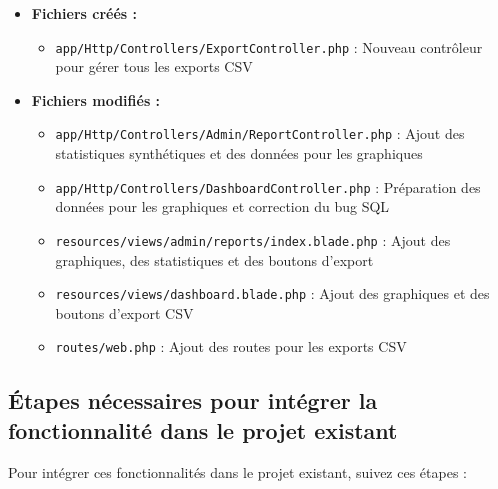 \documentclass[a4paper,12pt]{report}
\begin{document}
  \begin{itemize}
    \item \textbf{Fichiers créés :}
    \begin{itemize}
      \item \texttt{app/Http/Controllers/ExportController.php} : Nouveau contrôleur pour gérer tous les exports CSV
    \end{itemize}
    
    \item \textbf{Fichiers modifiés :}
    \begin{itemize}
      \item \texttt{app/Http/Controllers/Admin/ReportController.php} : Ajout des statistiques synthétiques et des données pour les graphiques
      \item \texttt{app/Http/Controllers/DashboardController.php} : Préparation des données pour les graphiques et correction du bug SQL
      \item \texttt{resources/views/admin/reports/index.blade.php} : Ajout des graphiques, des statistiques et des boutons d'export
      \item \texttt{resources/views/dashboard.blade.php} : Ajout des graphiques et des boutons d'export CSV
      \item \texttt{routes/web.php} : Ajout des routes pour les exports CSV
    \end{itemize}
  \end{itemize}

  \subsection{Étapes nécessaires pour intégrer la fonctionnalité dans le projet existant}
  Pour intégrer ces fonctionnalités dans le projet existant, suivez ces étapes :
  
\end{document}
